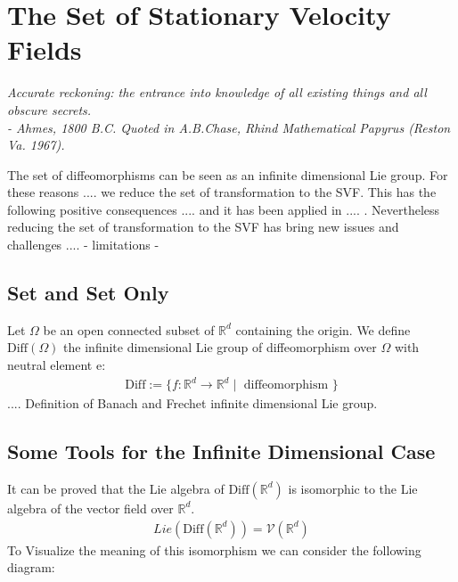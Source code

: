 
\chapter{The Set of Stationary Velocity Fields}\label{ch:svf}

\begin{flushright}
	\emph{Accurate reckoning: the entrance into knowledge of all existing things and all obscure secrets.\\
		- Ahmes, 1800 B.C. Quoted in A.B.Chase, Rhind Mathematical Papyrus (Reston Va. 1967).}
\end{flushright}

The set of diffeomorphisms can be seen as an infinite dimensional Lie group. For these reasons .... we reduce the set of transformation to the SVF. This has the following positive consequences .... and it has been applied in .... . Nevertheless reducing the set of transformation to the SVF has bring new issues and challenges .... - limitations - 

\section{Set and Set Only}
Let $\Omega$ be an open connected subset of $\mathbb{R}^d$ containing the origin.  We define $\text{Diff}(\Omega)$ the infinite dimensional Lie group of diffeomorphism over $\Omega$ with neutral element $\text{e}$:
\begin{align*}
\text{Diff}:= \lbrace f:\mathbb{R}^d \longrightarrow \mathbb{R}^d \mid \text{ diffeomorphism } \rbrace
\end{align*}
.... Definition of Banach and Frechet infinite dimensional Lie group.



\section{Some Tools for the Infinite Dimensional Case}

It can be proved that the Lie algebra of $\text{Diff}(\mathbb{R}^{d})$ is isomorphic to the Lie algebra of the vector field over $\mathbb{R}^{d}$.
\begin{align}\label{eq:mainaimliealgebra}
Lie(\text{Diff}(\mathbb{R}^{d})) = \mathcal{V}(\mathbb{R}^{d})
\end{align}
To Visualize the meaning of this isomorphism we can consider the following diagram:

